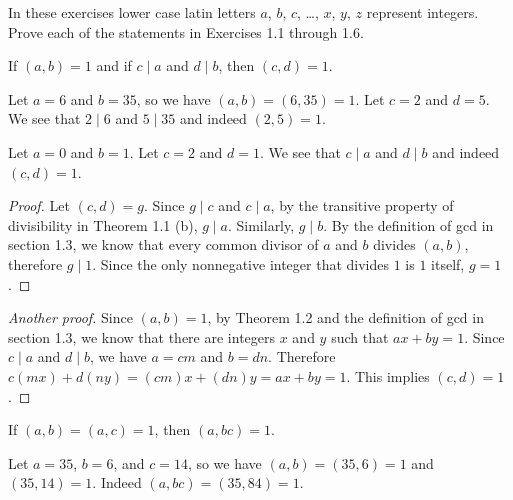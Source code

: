 In these exercises lower case latin letters \( a \), \( b \), \( c \),
\dots, \( x \), \( y \), \( z \) represent integers. Prove each of the
statements in Exercises 1.1 through 1.6.

\begin{exercise}{1.1}
  If \( (a, b) = 1 \) and if \( c \mid a \) and \( d \mid b \), then
  \( (c, d) = 1 \).
\end{exercise}

\begin{example}
  Let \( a = 6 \) and \( b = 35 \), so we have \( (a, b) = (6, 35) = 1
  \). Let \( c = 2 \) and \( d = 5 \). We see that \( 2 \mid 6 \) and
  \( 5 \mid 35 \) and indeed \( (2, 5) = 1 \).
\end{example}

\begin{example}
  Let \( a = 0 \) and \( b = 1 \). Let \( c = 2 \) and \( d = 1 \). We
  see that \( c \mid a \) and \( d \mid b \) and indeed \( (c, d) = 1
  \).
\end{example}

\begin{proof}
  Let \( (c, d) = g \). Since \( g \mid c \) and \( c \mid a \), by
  the transitive property of divisibility in Theorem 1.1 (b), \( g
  \mid a \). Similarly, \( g \mid b \). By the definition of gcd in
  section 1.3, we know that every common divisor of \( a \) and \( b
  \) divides \( (a, b) \), therefore \( g \mid 1 \). Since the only
  nonnegative integer that divides \( 1 \) is \( 1 \) itself, \( g = 1
  \).
\end{proof}

\begin{proof}[Another proof]
  Since \( (a, b) = 1 \), by Theorem 1.2 and the definition of gcd in
  section 1.3, we know that there are integers \( x \) and \( y \)
  such that \( ax + by = 1 \). Since \( c \mid a \) and \( d \mid b
  \), we have \( a = cm \) and \( b = dn \). Therefore \( c(mx) +
  d(ny) = (cm)x + (dn)y = ax + by = 1 \). This implies \( (c, d) = 1
  \).
\end{proof}


\begin{exercise}{1.2}
  If \( (a, b) = (a, c) = 1 \), then \( (a, bc) = 1 \).
\end{exercise}

\begin{example}
  Let \( a = 35 \), \( b = 6 \), and \( c = 14 \), so we have \( (a,
  b) = (35, 6) = 1 \) and \( (35, 14) = 1 \). Indeed \( (a, bc) = (35,
  84) = 1 \).
\end{example}

